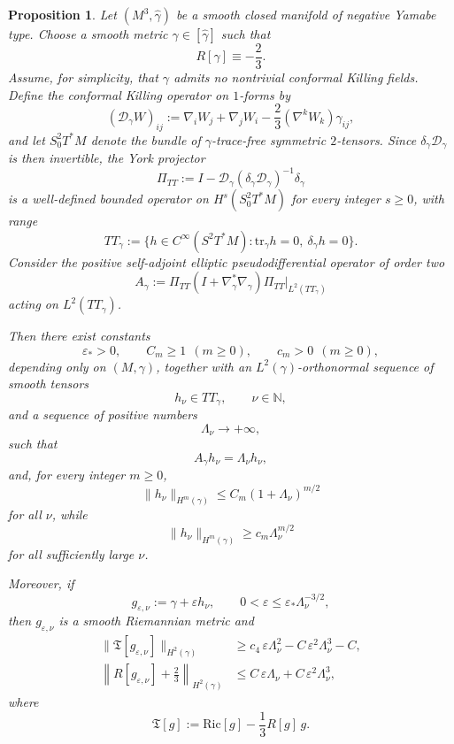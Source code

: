 \documentclass{amsart}
\newtheorem{proposition}{Proposition}[section]
\newcommand{\tr}{\mbox{tr}}
\begin{document}
\begin{proposition}
\label{prop:YorkTTperturb}
Let $(M^{3},\widehat{\gamma})$ be a smooth closed manifold of negative Yamabe type. Choose a smooth metric $\gamma\in[\widehat{\gamma}]$ such that
\[
R[\gamma]\equiv -\frac23.
\]
Assume, for simplicity, that $\gamma$ admits no nontrivial conformal Killing fields. Define the conformal Killing operator on $1$-forms by
\[
(\mathcal D_\gamma W)_{ij}
:=
\nabla_i W_j+\nabla_j W_i-\frac23(\nabla^kW_k)\gamma_{ij},
\]
and let $S^2_0T^*M$ denote the bundle of $\gamma$-trace-free symmetric $2$-tensors. Since $\delta_\gamma\mathcal D_\gamma$ is then invertible, the York projector
\[
\Pi_{TT}
:=
I-\mathcal D_\gamma(\delta_\gamma\mathcal D_\gamma)^{-1}\delta_\gamma
\]
is a well-defined bounded operator on $H^s(S^2_0T^*M)$ for every integer $s\ge0$, with range
\[
TT_\gamma
:=
\{h\in C^\infty(S^{2}T^{*}M):\tr_\gamma h=0,\ \delta_\gamma h=0\}.
\]
Consider the positive self-adjoint elliptic pseudodifferential operator of order two
\[
A_\gamma
:=
\Pi_{TT}(I+\nabla_\gamma^{*}\nabla_\gamma)\Pi_{TT}\big|_{L^2(TT_\gamma)}
\]
acting on $L^2(TT_\gamma)$.

\noindent Then there exist constants
\[
\varepsilon_{*}>0,\qquad C_m\ge1\ \ (m\ge0),\qquad c_m>0\ \ (m\ge0),
\]
depending only on $(M,\gamma)$, together with an $L^2(\gamma)$-orthonormal sequence of smooth tensors
\[
h_\nu\in TT_\gamma,\qquad \nu\in\mathbb N,
\]
and a sequence of positive numbers
\[
\Lambda_\nu\to+\infty,
\]
such that
\[
A_\gamma h_\nu=\Lambda_\nu h_\nu,
\]
and, for every integer $m\ge0$,
\[
\|h_\nu\|_{H^m(\gamma)}
\le C_m(1+\Lambda_\nu)^{m/2}
\]
for all $\nu$, while
\[
\|h_\nu\|_{H^m(\gamma)}
\ge c_m\Lambda_\nu^{m/2}
\]
for all sufficiently large $\nu$.

\noindent Moreover, if
\[
g_{\varepsilon,\nu}:=\gamma+\varepsilon h_\nu,
\qquad
0<\varepsilon\le \varepsilon_{*}\Lambda_\nu^{-3/2},
\]
then $g_{\varepsilon,\nu}$ is a smooth Riemannian metric and
\begin{align}
\label{eq:Tquantitative}
\|\mathfrak T[g_{\varepsilon,\nu}]\|_{H^2(\gamma)}
&\ge
c_{4}\,\varepsilon \Lambda_\nu^{2}
-
C\,\varepsilon^{2}\Lambda_\nu^{3}
-
C,\\
\label{eq:Rquantitative}
\left\|R[g_{\varepsilon,\nu}]+\frac23\right\|_{H^2(\gamma)}
&\le
C\,\varepsilon \Lambda_\nu
+
C\,\varepsilon^{2}\Lambda_\nu^{3},
\end{align}
where
\[
\mathfrak T[g]:=\text{Ric}[g]-\frac13R[g]\,g.
\]
\end{proposition}
\end{document}
